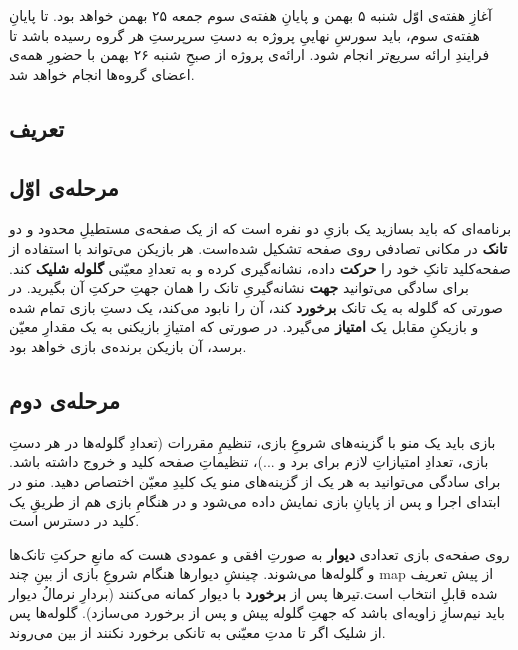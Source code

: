 \documentclass[a4paper,12pt]{paper}
\begin{document}
آغازِ هفته‌ی اوّل شنبه ۵ بهمن و پایانِ هفته‌ی سوم جمعه ۲۵ بهمن خواهد بود. تا پایانِ هفته‌ی سوم، باید سورسِ نهاییِ پروژه به دستِ سرپرستِ هر گروه رسیده باشد تا فرایندِ ارائه سریع‌تر انجام شود. ارائه‌ی پروژه از صبحِ شنبه ۲۶ بهمن با حضورِ همه‌ی اعضای گروه‌ها انجام خواهد شد.
\subsection{تعریف}
\subsection*{مرحله‌ی اوّل}
برنامه‌ای که باید بسازید یک بازیِ دو نفره است که از یک صفحه‌ی مستطیلِ محدود و دو \textbf{تانک} در مکانی تصادفی روی صفحه تشکیل شده‌است. هر بازیکن می‌تواند با استفاده از صفحه‌کلید تانکِ خود را \textbf{حرکت} داده، نشانه‌گیری کرده و به تعدادِ معیّنی  \textbf{گلوله} \textbf{شلیک} کند.  برای سادگی می‌توانید \textbf{جهت} نشانه‌گیریِ تانک را همان جهتِ حرکتِ آن بگیرید. در صورتی که گلوله به یک تانک \textbf{برخورد} کند، آن را نابود می‌کند، یک دستِ بازی تمام شده و بازیکنِ مقابل یک \textbf{امتیاز} می‌گیرد. در صورتی که امتیازِ بازیکنی به یک مقدارِ معیّن برسد، آن بازیکن برنده‌ی بازی خواهد بود.
\subsection*{مرحله‌ی دوم}
بازی باید یک منو با گزینه‌های شروعِ بازی، تنظیمِ مقررات (تعدادِ گلوله‌ها در هر دستِ بازی، تعدادِ امتیازاتِ لازم برای برد و ...)، تنظیماتِ صفحه کلید و خروج داشته باشد. برای سادگی می‌توانید به هر یک از گزینه‌های منو یک کلیدِ معیّن اختصاص دهید. منو در ابتدای اجرا و پس از پایانِ بازی نمایش داده می‌شود و در هنگامِ بازی هم از طریقِ یک کلید در دسترس است.

روی صفحه‌ی بازی تعدادی \textbf{دیوار} به صورتِ افقی و عمودی هست که مانعِ حرکتِ تانک‌ها و گلوله‌ها می‌شوند. چینشِ دیوار‌ها هنگام شروعِ بازی از بینِ چند {\en map}ِ از پیش تعریف شده قابلِ انتخاب است.تیر‌ها پس از \textbf{برخورد} با دیوار کمانه می‌کنند (بردارِ نرمالُ دیوار باید نیم‌سازِ زاویه‌ای باشد که جهتِ گلوله پیش و پس از برخورد می‌سازد). گلوله‌ها پس از شلیک اگر تا مدتِ معیّنی به تانکی برخورد نکنند از بین می‌روند.
\end{document}
